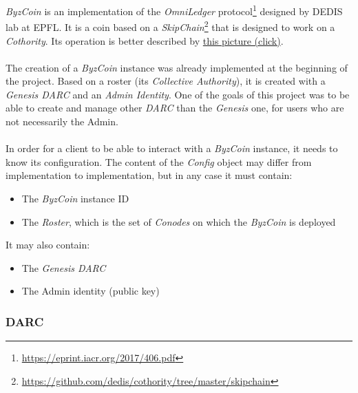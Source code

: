 \textit{ByzCoin} is an implementation of the \textit{OmniLedger} protocol\footnote{\url{https://eprint.iacr.org/2017/406.pdf}} designed by DEDIS lab at EPFL. It is a coin based on a \textit{SkipChain}\footnote{\url{https://github.com/dedis/cothority/tree/master/skipchain}} that is designed to work on a \textit{Cothority}. Its operation is better described by \href{https://raw.githubusercontent.com/dedis/cothority/master/byzcoin/ByzCoin.png}{this picture (click)}.

\paragraph{}

The creation of a \textit{ByzCoin} instance was already implemented at the beginning of the project. Based on a roster (its \textit{Collective Authority}), it is created with a \textit{Genesis DARC} and an \textit{Admin Identity}. One of the goals of this project was to be able to create and manage other \textit{DARC} than the \textit{Genesis} one, for users who are not necessarily the Admin.

\paragraph{}

In order for a client to be able to interact with a \textit{ByzCoin} instance, it needs to know its configuration. The content of the \textit{Config} object may differ from implementation to implementation, but in any case it must contain:

\begin{itemize}
    \item The \textit{ByzCoin} instance ID
    \item The \textit{Roster}, which is the set of \textit{Conodes} on which the \textit{ByzCoin} is deployed
\end{itemize}

It may also contain:

\begin{itemize}
    \item The \textit{Genesis DARC}
    \item The Admin identity (public key)
\end{itemize}

\subsubsection{DARC}
\label{subsection212}


